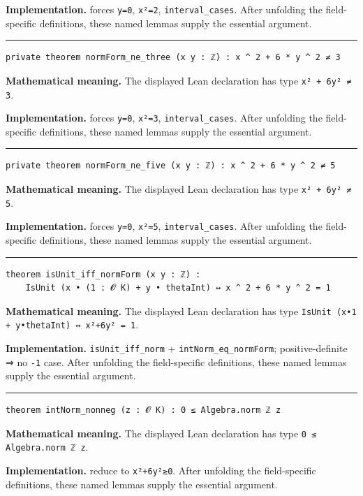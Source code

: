 \documentclass[UTF8,a4paper,11pt,fontset=fandol]{ctexart}
\theoremstyle{definition}
\newcommand{\statementsep}{\par\medskip\hrule\medskip}
\begin{document}
\noindent\textbf{Implementation.} forces \texttt{y=0}, \texttt{x²=2}, \texttt{interval\_\allowbreak{}cases}. After unfolding the field-specific definitions, these named lemmas supply the essential argument.\par
\statementsep
\begin{verbatim}
private theorem normForm_ne_three (x y : ℤ) : x ^ 2 + 6 * y ^ 2 ≠ 3
\end{verbatim}
\noindent\textbf{Mathematical meaning.} The displayed Lean declaration has type \texttt{x² + 6y² ≠ 3}.\par
\noindent\textbf{Implementation.} forces \texttt{y=0}, \texttt{x²=3}, \texttt{interval\_\allowbreak{}cases}. After unfolding the field-specific definitions, these named lemmas supply the essential argument.\par
\statementsep
\begin{verbatim}
private theorem normForm_ne_five (x y : ℤ) : x ^ 2 + 6 * y ^ 2 ≠ 5
\end{verbatim}
\noindent\textbf{Mathematical meaning.} The displayed Lean declaration has type \texttt{x² + 6y² ≠ 5}.\par
\noindent\textbf{Implementation.} forces \texttt{y=0}, \texttt{x²=5}, \texttt{interval\_\allowbreak{}cases}. After unfolding the field-specific definitions, these named lemmas supply the essential argument.\par
\statementsep
\begin{verbatim}
theorem isUnit_iff_normForm (x y : ℤ) :
    IsUnit (x • (1 : 𝓞 K) + y • thetaInt) ↔ x ^ 2 + 6 * y ^ 2 = 1
\end{verbatim}
\noindent\textbf{Mathematical meaning.} The displayed Lean declaration has type \texttt{IsUnit (x•1 + y•thetaInt) ↔ x²+6y² = 1}.\par
\noindent\textbf{Implementation.} \texttt{isUnit\_\allowbreak{}iff\_\allowbreak{}norm} + \texttt{intNorm\_\allowbreak{}eq\_\allowbreak{}normForm}; positive-definite ⇒ no \texttt{-1} case. After unfolding the field-specific definitions, these named lemmas supply the essential argument.\par
\statementsep
\begin{verbatim}
theorem intNorm_nonneg (z : 𝓞 K) : 0 ≤ Algebra.norm ℤ z
\end{verbatim}
\noindent\textbf{Mathematical meaning.} The displayed Lean declaration has type \texttt{0 ≤ Algebra.\allowbreak{}norm ℤ z}.\par
\noindent\textbf{Implementation.} reduce to \texttt{x²+6y²≥0}. After unfolding the field-specific definitions, these named lemmas supply the essential argument.\par
\end{document}
